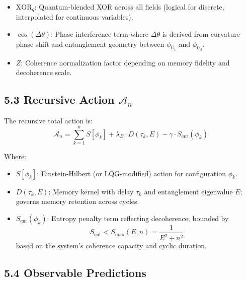 \begin{itemize}
  \item \( \text{XOR}_q \): Quantum-blended XOR across all fields (logical for discrete, interpolated for continuous variables). 
  \item \( \cos(\Delta \theta) \): Phase interference term where \( \Delta \theta \) is derived from curvature phase shift and entanglement geometry between \( \phi_{U_1} \) and \( \phi_{U_2} \).
  \item \( Z \): Coherence normalization factor depending on memory fidelity and decoherence scale.
\end{itemize}

\subsection*{5.3 Recursive Action \( \mathcal{A}_n \)}

The recursive total action is:
\begin{equation}
\mathcal{A}_n = \sum_{k=1}^{n} S[\phi_k] + \lambda_E \cdot D(\tau_k, E) - \gamma \cdot S_{\text{ent}}(\phi_k)
\end{equation}

\noindent
Where:
\begin{itemize}
  \item \( S[\phi_k] \): Einstein-Hilbert (or LQG-modified) action for configuration \( \phi_k \).
  \item \( D(\tau_k, E) \): Memory kernel with delay \( \tau_k \) and entanglement eigenvalue \( E \); governs memory retention across cycles.
  \item \( S_{\text{ent}}(\phi_k) \): Entropy penalty term reflecting decoherence; bounded by
  \[
    S_{\text{ent}} < S_{\text{max}}(E, n) = \frac{1}{E^2 + n^2}
  \]
  based on the system's coherence capacity and cyclic duration.
\end{itemize}

\subsection*{5.4 Observable Predictions}

